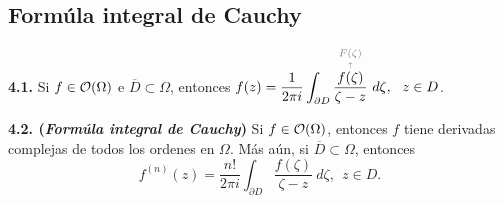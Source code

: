 
\subsection*{Formúla integral de Cauchy}

\vspace{-0.7cm}
\hypertarget{thm241}{}
\begin{theorem}
    \textbf{4.1.} Si \(f\in \mathcal{O}(\Omega)\) e \(\overline{D}\subset \Omega\), entonces 
    \(\displaystyle f(z) = \frac{1}{2\pi i } \int_{\partial D} \overset{\textcolor{gray}{\underset{\uparrow }{F(\zeta)}}}{\frac{f(\zeta)}{\zeta - z}} \ d\zeta, \  \ z \in D \).
\end{theorem}


\hypertarget{coro242}{}
\begin{corollary}
    \textbf{4.2. (\emph{Formúla integral de Cauchy})} Si \( f\in \mathcal{O}(\Omega)\), entonces \(f\) tiene derivadas complejas de todos los ordenes en \(\Omega\). Más aún, si \(\overline{D}\subset \Omega \), entonces 
    \[f^{(n)}(z) = \frac{n!}{2\pi i } \int_{\partial D} \frac{f(\zeta)}{\zeta - z} \ d\zeta, \ \ z \in D.\]
\end{corollary}

